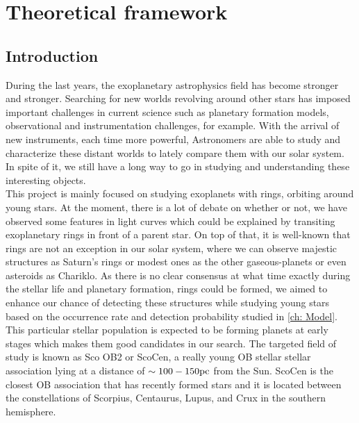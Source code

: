 \chapter{ \textbf{Theoretical framework} }\label{ch:Theoretical}
\vspace{0.5cm} 

\section{Introduction}\label{sec:Intro}

During the last years, the exoplanetary astrophysics field has become stronger and stronger. Searching for new worlds revolving around other stars has imposed important challenges in current science such as planetary formation models, observational and instrumentation challenges, for example. With the arrival of new instruments, each time more powerful, Astronomers are able to study and characterize these distant worlds to lately compare them with our solar system. In spite of it, we still have a long way to go in studying and understanding these interesting objects.\\

This project is mainly focused on studying exoplanets with rings, orbiting around young stars. At the moment, there is a lot of debate on whether or not, we have observed some features in light curves which could be explained by transiting exoplanetary rings in front of a parent star. On top of that, it is well-known that rings are not an exception in our solar system, where we can observe majestic structures as Saturn's rings or modest ones as the other gaseous-planets or even asteroids as Chariklo. As there is no clear consensus at what time exactly during the stellar life and planetary formation, rings could be formed, we aimed to enhance our chance of detecting these structures while studying young stars based on the occurrence rate and detection probability studied in \autoref{ch: Model}. This particular stellar population is expected to be forming planets at early stages which makes them good candidates in our search. The targeted field of study is known as Sco OB2 or ScoCen, a really young OB stellar stellar association lying at a distance of $\sim100-150 \textnormal{pc}$ from the Sun. ScoCen is the closest OB association that has recently formed stars and it is located between the constellations of Scorpius, Centaurus, Lupus, and Crux in the southern hemisphere.\\ 

